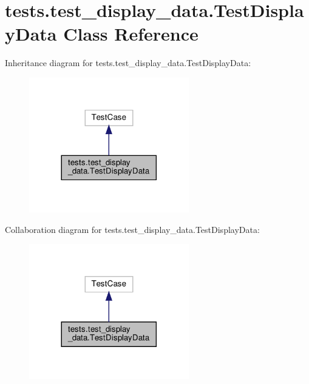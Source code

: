 \hypertarget{classtests_1_1test__display__data_1_1TestDisplayData}{}\section{tests.\+test\+\_\+display\+\_\+data.\+Test\+Display\+Data Class Reference}
\label{classtests_1_1test__display__data_1_1TestDisplayData}


Inheritance diagram for tests.\+test\+\_\+display\+\_\+data.\+Test\+Display\+Data\+:\nopagebreak
\begin{figure}[H]
\begin{center}
\leavevmode
\includegraphics[width=197pt]{da/d34/classtests_1_1test__display__data_1_1TestDisplayData__inherit__graph}
\end{center}
\end{figure}


Collaboration diagram for tests.\+test\+\_\+display\+\_\+data.\+Test\+Display\+Data\+:\nopagebreak
\begin{figure}[H]
\begin{center}
\leavevmode
\includegraphics[width=197pt]{d9/da5/classtests_1_1test__display__data_1_1TestDisplayData__coll__graph}
\end{center}
\end{figure}
